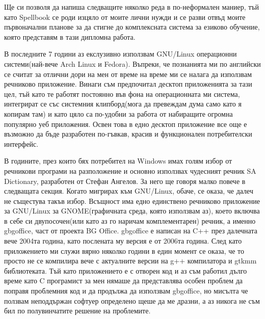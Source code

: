 Ще си позволя да напиша следващите няколко реда в по-неформален
маниер, тъй като Spellbook се роди изцяло от моите лични нужди и се
разви отвъд моите първоначални планове за да стигне до комплексната
система за езиково обучение, която представям в тази дипломна работа.

В последните 7 години аз екслузивно използвам GNU/Linux операционни
системи(най-вече Arch Linux и Fedora). Въпреки, че познанията ми по
английски се считат за отлични дори на мен от време на време ми се
налага да използвам речниково приложение. Винаги съм предпочитал
десктоп приложенията за тази цел, тъй като те работят постоянно във
фона на операционната ми система, интегрират се със системния
клипборд(мога да превеждам дума само като я копирам там) и като цяло
са по-удобни за работа от набиращите огромна популярно уеб
приложения. Освен това в едно десктоп приложение все още е възможно да
бъде разработен по-гъвкав, красив и функционален потребителски
интерфейс. 

В годините, през които бях потребител на Windows имах голям избор от
речникови програми на разположение и основно използвах чудесният
речник SA Dictionary, разработен от Стефан Ангелов. За него ще говоря
малко повече в следващата секция. Когато мигрирах към GNU/Linux,
обаче, се оказа, че далеч не същестува такъв избор. Всъщност има едно
единствено речниково приложение за GNU/Linux за GNOME(графичната
среда, която използвам аз), което включва в себе си
двупосочен(или като аз го наричам комплементарен) речник, а именно
gbgoffice, част от проекта BG Office. gbgoffice е написан на C++ през
далечната вече 2004та година, като послената му версия е от 2006та
година. След като приложението ми служи вярно няколко години в един
момент се оказа, че то просто не се компилира вече с актуалните версии
на g++ компилатора и gtkmm библиотеката. Тъй като приложението е с
отворен код и аз съм работил дълго време като C програмист за мен
нямаше да представлява особен проблем да поправя проблемния код и да
продължа да използвам gbgoffice, но мисълта че ползвам неподдържан
софтуер определено щеше да ме дразни, а аз никога не съм бил по
полувинчатите решение на проблемите. 

